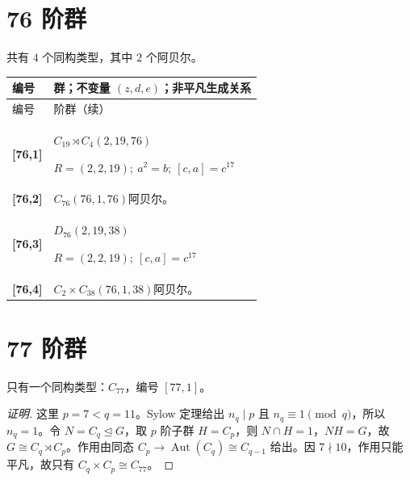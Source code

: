 \documentclass[UTF8,fontset=fandol,11pt,a4paper]{ctexart}
\newcommand{\Aut}{\operatorname{Aut}}\newcommand{\GL}{\operatorname{GL}}\newcommand{\ord}{\operatorname{ord}}\newcommand{\Z}{\mathrm Z}
\begin{document}
\section*{76 阶群}\label{order:76}

共有 $4$ 个同构类型，其中 $2$ 个阿贝尔。

\begingroup\small\setlength{\tabcolsep}{3pt}\renewcommand{\arraystretch}{1.12}

\begin{longtable}{@{}p{17mm}>{\raggedright\arraybackslash}p{141mm}@{}}

\toprule 编号 & 群；不变量 $(z,d,e)$；非平凡生成关系\\\midrule\endfirsthead

\toprule 编号 & 76 阶群（续）\\\midrule\endhead\bottomrule\endfoot

\textbf{[76,1]} & $C_{19}\rtimes C_{4}$\quad $(2,19,76)$\par\(R=(2,2,19);\allowbreak\ a^{2}=b;\allowbreak\ [c,a]=c^{17}\)\\[3pt]

\textbf{[76,2]} & $C_{76}$\quad $(76,1,76)$\quad 阿贝尔。\\[3pt]

\textbf{[76,3]} & $D_{76}$\quad $(2,19,38)$\par\(R=(2,2,19);\allowbreak\ [c,a]=c^{17}\)\\[3pt]

\textbf{[76,4]} & $C_{2}\times C_{38}$\quad $(76,1,38)$\quad 阿贝尔。\\[3pt]

\end{longtable}\endgroup

\section*{77 阶群}\label{order:77}

只有一个同构类型：$C_{77}$，编号 $[77,1]$。

\begin{proof}[证明]
这里 $p=7<q=11$。Sylow 定理给出 $n_q\mid p$ 且 $n_q\equiv1\pmod q$，所以 $n_q=1$。令 $N=C_q\trianglelefteq G$，取 $p$ 阶子群 $H=C_p$，则 $N\cap H=1$，$NH=G$，故 $G\cong C_q\rtimes C_p$。作用由同态 $C_p\to\Aut(C_q)\cong C_{q-1}$ 给出。因 $7\nmid 10$，作用只能平凡，故只有 $C_q\times C_p\cong C_{77}$。
\end{proof}
\end{document}
